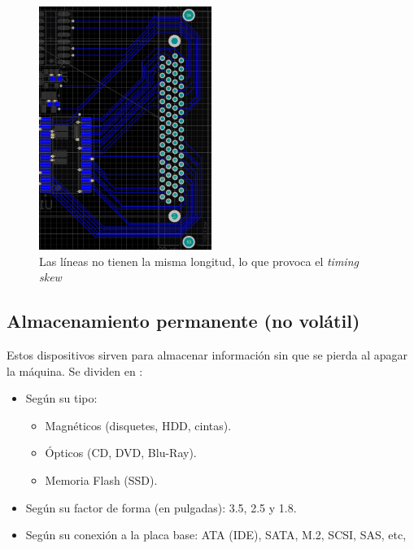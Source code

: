 \documentclass[12pt,spanish]{article}
\begin{document}
\begin{figure}[H]
	\centering
	\includegraphics[angle=90,width=0.5\textwidth]{timskew.jpg}
	\caption{Las líneas no tienen la misma longitud, lo que provoca el \textit{timing skew}}
\end{figure}

\subsection{Almacenamiento permanente (no volátil)}

Estos dispositivos sirven para almacenar información sin que se pierda al apagar la máquina. Se dividen en :
\begin{itemize}
	\item Según su tipo:
	\begin{itemize}
		\item Magnéticos (disquetes, HDD, cintas).
		\item Ópticos (CD, DVD, Blu-Ray).
		\item Memoria Flash (SSD).
	\end{itemize}
	\item Según su factor de forma (en pulgadas): 3.5, 2.5 y 1.8.
	\item Según su conexión a la placa base: ATA (IDE), SATA, M.2, SCSI, SAS, etc,
\end{itemize}
\end{document}
